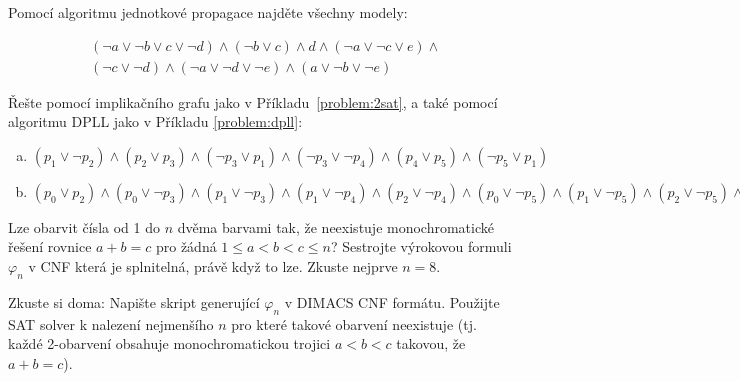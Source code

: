 \begin{problem} 
    
    Pomocí algoritmu jednotkové propagace najděte všechny modely:

    \begin{align*}
    &(\neg a \vee \neg b \vee c \vee \neg d)\wedge(\neg b \vee c)\wedge d \wedge (\neg a \vee \neg c \vee e)\wedge \\
    &(\neg c \vee \neg d)\wedge(\neg a \vee \neg d \vee \neg e)\wedge(a\vee \neg b \vee\neg e)
    \end{align*}

\end{problem}

    
\begin{problem} 
    
    Řešte pomocí implikačního grafu jako v Příkladu~\ref{problem:2sat}, a také pomocí algoritmu DPLL jako v Příkladu \ref{problem:dpll}:
    \begin{enumerate}[(a)]
        \item $(p_1\vee \neg p_2)\wedge (p_2\vee p_3)\wedge (\neg p_3\vee p_1)\wedge (\neg p_3\vee \neg p_4)\wedge (p_4\vee p_5)\wedge (\neg p_5\vee p_1)$
        \item $(p_0 \vee  p_2) \wedge  (p_0 \vee  \neg p_3) \wedge  (p_1 \vee  \neg p_3) 
        \wedge  (p_1 \vee  \neg p_4) \wedge  (p_2 \vee  \neg p_4) 
        \wedge  (p_0 \vee  \neg p_5)
        \wedge 
        (p_1 \vee  \neg p_5) \wedge  (p_2 \vee  \neg p_5) \wedge  (\neg p_1 \vee  \neg p_6) \wedge  (p_4 \vee  p_6) \wedge  (p_5 \vee  p_6) \wedge  p_1\wedge \neg p_7$
    \end{enumerate}

\end{problem}


\begin{problem}
    Lze obarvit čísla od 1 do $n$ dvěma barvami tak, že neexistuje monochromatické řešení rovnice
    $a+b=c$ pro žádná $1\leq a<b<c\leq n$? Sestrojte výrokovou formuli $\varphi_n$ v CNF která je splnitelná, právě když to lze. Zkuste nejprve $n=8$.
    
    Zkuste si doma: Napište skript generující $\varphi_n$ v DIMACS CNF formátu. Použijte SAT solver k nalezení nejmenšího $n$ pro které takové obarvení neexistuje (tj. každé 2-obarvení obsahuje monochromatickou trojici $a<b<c$ takovou, že $a+b=c$).
\end{problem}

